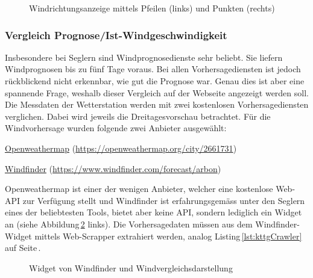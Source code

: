 \begin{figure}[htbp!]
	\centering
	\caption{Windrichtungsanzeige mittels Pfeilen (links) und Punkten (rechts)}
	\label{img:windrichtung}
\end{figure}

\subsubsection{Vergleich Prognose/Ist-Windgeschwindigkeit}
Insbesondere bei Seglern sind Windprognosedienste sehr beliebt. Sie liefern Windprognosen bis zu fünf Tage voraus. Bei allen Vorhersagediensten ist jedoch rückblickend nicht erkennbar, wie gut die Prognose war. Genau dies ist aber eine spannende Frage, weshalb dieser Vergleich auf der Webseite angezeigt werden soll. Die Messdaten der Wetterstation werden mit zwei kostenlosen Vorhersagediensten verglichen. Dabei wird jeweils die Dreitagesvorschau betrachtet. Für die Windvorhersage wurden folgende zwei Anbieter ausgewählt:
\begin{itemize*}
\item \href{https://openweathermap.org/city/2661731}{Openweathermap} (\url{https://openweathermap.org/city/2661731})
\item \href{https://www.windfinder.com/forecast/arbon}{Windfinder} (\url{https://www.windfinder.com/forecast/arbon})
\end{itemize*}

\noindent
Openweathermap ist einer der wenigen Anbieter, welcher eine kostenlose Web-API zur Verfügung stellt und Windfinder ist erfahrungsgemäss unter den Seglern eines der beliebtesten Tools, bietet aber keine API, sondern lediglich ein Widget an (siehe Abbildung\,\ref{img:windfinder} links). Die Vorhersagedaten müssen aus dem Windfinder-Widget mittels Web-Scrapper extrahiert werden, analog Listing\,\ref{lst:kttgCrawler} auf Seite\,\pageref{lst:kttgCrawler}.

\begin{figure}[h!]
	\centering
	\caption{Widget von Windfinder und Windvergleichsdarstellung}
	\label{img:windfinder}
\end{figure}


